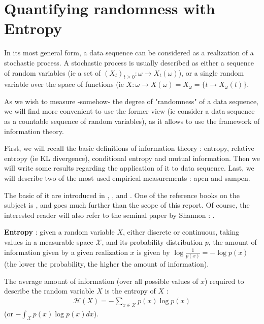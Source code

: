 \chapter{Quantifying randomness with Entropy}\label{sec:Entropy and randomness}

In its most general form, a data sequence can be considered as a realization of a stochastic process. A stochastic process is usually described as either a sequence of random variables (ie a set of $(X_t)_{t \geq 0} : \omega \rightarrow X_t({\omega})$), or a single random variable over the space of functions (ie $X : \omega \rightarrow X(\omega) = X_{\omega} = \{ t \rightarrow X_{\omega}(t) \}$.

As we wish to measure -somehow- the degree of "randomness" of a data sequence, we will find more convenient to use the former view (ie consider a data sequence as a countable sequence of random variables), as it allows to use the framework of information theory.

First, we will recall the basic definitions of information theory : entropy, relative entropy (ie KL divergence), conditional entropy and mutual information. Then we will write some results regarding the application of \gls{it} to data sequence. Last, we will describe two of the most used empirical measurements : \gls{apen} and \gls{sampen}.

The basic of \gls{it} are introduced in \cite{bishop_pattern_2016}, \cite{ProbabilisticGraphicalModels}, and \cite{ProbabilisticMachineLearning}. One of the reference books on the subject is \cite{cover_elements_2006}, and goes much further than the scope of this report. Of course, the interested reader will also refer to the seminal paper by Shannon : \cite{shannon_mathematical_1948}.

\textbf{Entropy} : given a random variable $X$, either discrete or continuous, taking values in a measurable space $\mathcal{X}$, and its probability distribution $p$, the amount of information given by a given realization $x$ is given by $\log{\frac{1}{p(x)}} = - \log{p(x)}$ (the lower the probability, the higher the amount of information). 

The average amount of information (over all possible values of $x$) required to describe the random variable $X$ is the entropy of $X$ : 
\begin{align}
    \mathcal{H}(X) = - \sum_{x \in \mathcal{X}} p(x)\log{p(x)}
\end{align}
(or $-\int_{\mathcal{X}} p(x)\log{p(x)}dx$).

